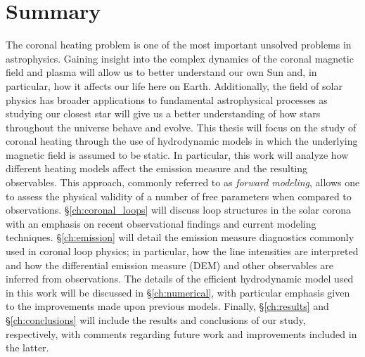 \section{Summary}
\label{sec:summary}
%
The coronal heating problem is one of the most important unsolved problems in astrophysics. Gaining insight into the complex dynamics of the coronal magnetic field and plasma will allow us to better understand our own Sun and, in particular, how it affects our life here on Earth. Additionally, the field of solar physics has broader applications to fundamental astrophysical processes as studying our closest star will give us a better understanding of how stars throughout the universe behave and evolve. This thesis will focus on the study of coronal heating through the use of hydrodynamic models in which the underlying magnetic field is assumed to be static. In particular, this work will analyze how different heating models affect the emission measure and the resulting observables. This approach, commonly referred to as \textit{forward modeling}, allows one to assess the physical validity of a number of free parameters when compared to observations. \S\ref{ch:coronal_loops} will discuss loop structures in the solar corona with an emphasis on recent observational findings and current modeling techniques. \S\ref{ch:emission} will detail the emission measure diagnostics commonly used in coronal loop physics; in particular, how the line intensities are interpreted and how the differential emission measure (DEM) and other observables are inferred from observations. The details of the efficient hydrodynamic model used in this work will be discussed in \S\ref{ch:numerical}, with particular emphasis given to the improvements made upon previous models. Finally, \S\ref{ch:results} and \S\ref{ch:conclusions} will include the results and conclusions of our study, respectively, with comments regarding future work and improvements included in the latter. 